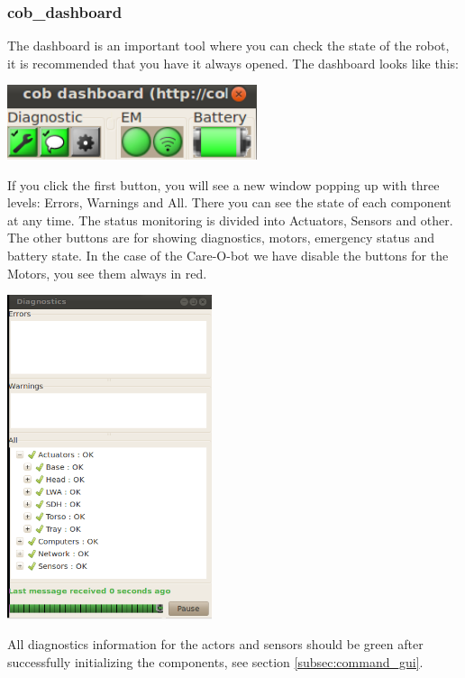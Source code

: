\subsubsection{cob\_dashboard}\label{subsec:dashboard}
The dashboard is an important tool where you can check the state of the robot, it is recommended that you have it always opened. The dashboard looks like this:

\begin{center}
\includegraphics[width=0.55\textwidth]{images/dashboard.png}
\end{center}
If you click the first button, you will see a new window popping up with three levels: Errors, Warnings and All. There you can see the state of each component at any time. The status monitoring is divided into Actuators, Sensors and other. The other buttons are for showing diagnostics, motors, emergency status and battery state. In the case of the Care-O-bot we have disable the buttons for the Motors, you see them always in red.

\begin{center}
\includegraphics[width=0.45\textwidth]{images/diagnostics.png}
\end{center}

All diagnostics information for the actors and sensors should be green after successfully initializing the components, see section \ref{subsec:command_gui}.


